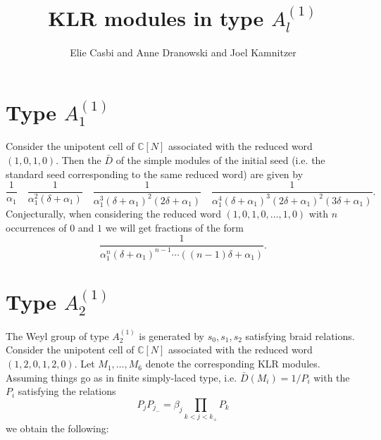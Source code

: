 \documentclass[11pt]{article}
\begin{document}
\theoremstyle{plain}
\newtheorem{deftn}{Definition}[section]
\newtheorem{lem}[deftn]{Lemma}
\newtheorem{prop}[deftn]{Proposition}
\newtheorem{thm}[deftn]{Theorem}
\newtheorem{cor}[deftn]{Corollary}
\newtheorem{conj}[deftn]{Conjecture}
\newtheorem{Question}[deftn]{Question}
\newtheorem{Fact}{Evidence}
\newtheorem{assump}{Assumption}[section]
\renewcommand{\theassump}{\Alph{assump}}
\newtheorem{conjintro}{Conjecture}
\newtheorem{thmintro}{Theorem}

\theoremstyle{definition}
\newtheorem{ex}[deftn]{Example}
\newtheorem{rk}[deftn]{Remark}


\newcommand{\CQ}{\mathcal{C}_Q}
\newcommand{\CZ}{\mathcal{C}_{\mathbb{Z}}}
\newcommand{\Atn}{\mathcal{A}_t (\mathfrak{n})}
\newcommand{\CN}{\mathbb{C}[N]}


\title{KLR modules in type $A_l^{(1)}$}
  \author{Elie Casbi and Anne Dranowski and Joel Kamnitzer}
 
     \date{}

\maketitle

\section{Type $A_1^{(1)}$}

Consider the unipotent cell of $\CN$ associated with the reduced word $(1,0,1,0)$. Then the $\bar{D}$ of the simple modules of the  initial seed (i.e. the standard seed corresponding to the same reduced word) are given by 
$$ \frac{1}{\alpha_1} \quad  \frac{1}{\alpha_1^2(\delta + \alpha_1)} \quad  \frac{1}{\alpha_1^3(\delta + \alpha_1)^2(2 \delta + \alpha_1)} \quad \frac{1}{\alpha_1^4(\delta + \alpha_1)^3(2 \delta + \alpha_1)^2(3 \delta + \alpha_1)} . $$ 
Conjecturally, when considering the reduced word $(1,0,1,0, \ldots , 1,0)$ with $n$ occurrences of $0$ and $1$ we will get fractions of the form 
$$  \frac{1}{\alpha_1^n(\delta + \alpha_1)^{n-1} \cdots ((n-1) \delta + \alpha_1)} . $$ 

 \section{Type $A_2^{(1)}$}
 
  The Weyl group of type $A_2^{(1)}$ is generated by $s_0,s_1,s_2$ satisfying braid relations. 
  Consider the unipotent cell of $\CN$ associated with the reduced word $(1,2,0,1,2,0)$. Let $M_1, \ldots , M_6$ denote the corresponding KLR modules. Assuming things go as in finite simply-laced type, i.e. $\bar{D}(M_i) = 1/P_i$ with the $P_i$ satisfying the relations 
  $$ P_j P_{j_{-}} = \beta_j \prod_{k < j < k_{+}} P_k $$
  we obtain the following:
  
\end{document}

